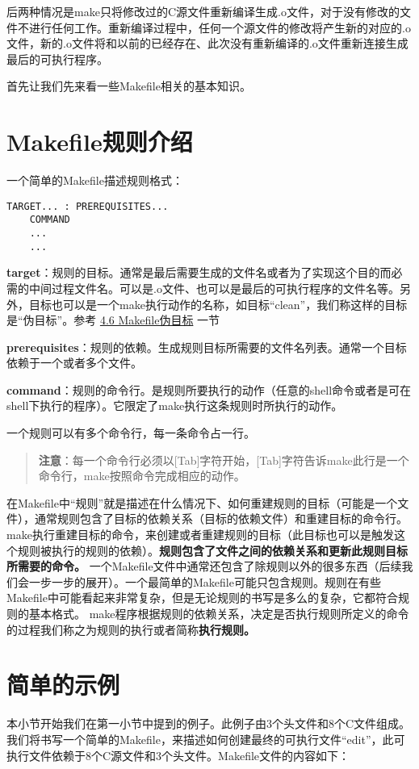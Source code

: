 后两种情况是make只将修改过的C源文件重新编译生成.o文件，对于没有修改的文件不进行任何工作。重新编译过程中，任何一个源文件的修改将产生新的对应的.o文件，新的.o文件将和以前的已经存在、此次没有重新编译的.o文件重新连接生成最后的可执行程序。

首先让我们先来看一些Makefile相关的基本知识。


\section{Makefile规则介绍}
一个简单的Makefile描述规则格式：
\begin{Verbatim}[]
TARGET... : PREREQUISITES...
    COMMAND
    ...
    ...
\end{Verbatim}

\textbf{target}：规则的目标。通常是最后需要生成的文件名或者为了实现这个目的而必需的中间过程文件名。可以是.o文件、也可以是最后的可执行程序的文件名等。另外，目标也可以是一个make执行动作的名称，如目标“clean”，我们称这样的目标是“伪目标”。参考 \hyperref[sec:4.6]{4.6 Makefile伪目标} 一节

\textbf{prerequisites}：规则的依赖。生成规则目标所需要的文件名列表。通常一个目标依赖于一个或者多个文件。

\textbf{command}：规则的命令行。是规则所要执行的动作（任意的shell命令或者是可在shell下执行的程序）。它限定了make执行这条规则时所执行的动作。

一个规则可以有多个命令行，每一条命令占一行。

\begin{quote}\kaishu
  \textbf{注意}：每一个命令行必须以[Tab]字符开始，[Tab]字符告诉make此行是一个命令行，make按照命令完成相应的动作。
\end{quote}


在Makefile中“规则”就是描述在什么情况下、如何重建规则的目标（可能是一个文件），通常规则包含了目标的依赖关系（目标的依赖文件）和重建目标的命令行。make执行重建目标的命令，来创建或者重建规则的目标（此目标也可以是触发这个规则被执行的规则的依赖）。\textbf{规则包含了文件之间的依赖关系和更新此规则目标所需要的命令。}
一个Makefile文件中通常还包含了除规则以外的很多东西（后续我们会一步一步的展开）。一个最简单的Makefile可能只包含规则。规则在有些Makefile中可能看起来非常复杂，但是无论规则的书写是多么的复杂，它都符合规则的基本格式。
make程序根据规则的依赖关系，决定是否执行规则所定义的命令的过程我们称之为规则的执行或者简称\textbf{执行规则。}


\section{简单的示例}
本小节开始我们在第一小节中提到的例子。此例子由3个头文件和8个C文件组成。我们将书写一个简单的Makefile，来描述如何创建最终的可执行文件“edit”，此可执行文件依赖于8个C源文件和3个头文件。Makefile文件的内容如下：

